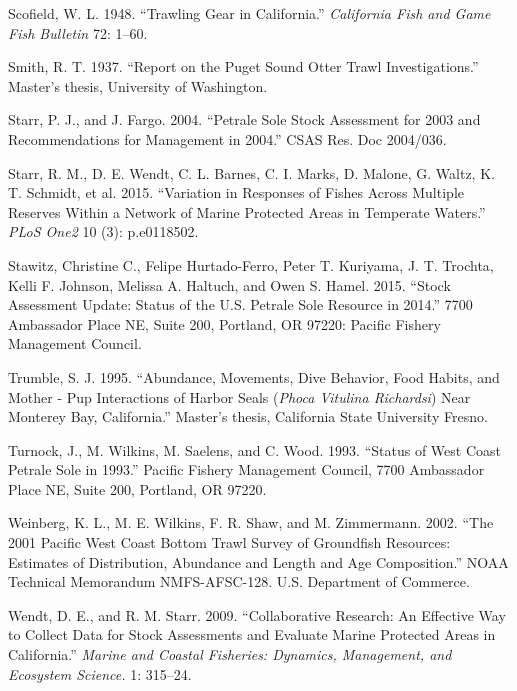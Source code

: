 \documentclass[11pt,
  english,
  letterpaper,
]{article}
\newlength{\cslhangindent}
\newenvironment{cslreferences}%
  {\setlength{\parindent}{0pt}%
  \everypar{\setlength{\hangindent}{\cslhangindent}}\ignorespaces}%
  {\par}
\begin{document}
\begin{cslreferences}
\leavevmode\hypertarget{ref-scofield_trawling_1948}{}%
Scofield, W. L. 1948. ``Trawling Gear in California.'' \emph{California Fish and Game Fish Bulletin} 72: 1--60.

\leavevmode\hypertarget{ref-smith_report_1937}{}%
Smith, R. T. 1937. ``Report on the Puget Sound Otter Trawl Investigations.'' Master's thesis, University of Washington.

\leavevmode\hypertarget{ref-starr_petrale_2004}{}%
Starr, P. J., and J. Fargo. 2004. ``Petrale Sole Stock Assessment for 2003 and Recommendations for Management in 2004.'' CSAS Res. Doc 2004/036.

\leavevmode\hypertarget{ref-Starr2015}{}%
Starr, R. M., D. E. Wendt, C. L. Barnes, C. I. Marks, D. Malone, G. Waltz, K. T. Schmidt, et al. 2015. ``Variation in Responses of Fishes Across Multiple Reserves Within a Network of Marine Protected Areas in Temperate Waters.'' \emph{PLoS One2} 10 (3): p.e0118502.

\leavevmode\hypertarget{ref-stawitz_stock_2015}{}%
Stawitz, Christine C., Felipe Hurtado-Ferro, Peter T. Kuriyama, J. T. Trochta, Kelli F. Johnson, Melissa A. Haltuch, and Owen S. Hamel. 2015. ``Stock Assessment Update: Status of the U.S. Petrale Sole Resource in 2014.'' 7700 Ambassador Place NE, Suite 200, Portland, OR 97220: Pacific Fishery Management Council.

\leavevmode\hypertarget{ref-trumble_abundance_1995}{}%
Trumble, S. J. 1995. ``Abundance, Movements, Dive Behavior, Food Habits, and Mother - Pup Interactions of Harbor Seals (\emph{Phoca Vitulina Richardsi}) Near Monterey Bay, California.'' Master's thesis, California State University Fresno.

\leavevmode\hypertarget{ref-turnock_status_1993}{}%
Turnock, J., M. Wilkins, M. Saelens, and C. Wood. 1993. ``Status of West Coast Petrale Sole in 1993.'' Pacific Fishery Management Council, 7700 Ambassador Place NE, Suite 200, Portland, OR 97220.

\leavevmode\hypertarget{ref-weinberg_2001_2002}{}%
Weinberg, K. L., M. E. Wilkins, F. R. Shaw, and M. Zimmermann. 2002. ``The 2001 Pacific West Coast Bottom Trawl Survey of Groundfish Resources: Estimates of Distribution, Abundance and Length and Age Composition.'' NOAA Technical Memorandum NMFS-AFSC-128. U.S. Department of Commerce.

\leavevmode\hypertarget{ref-Wendt2009}{}%
Wendt, D. E., and R. M. Starr. 2009. ``Collaborative Research: An Effective Way to Collect Data for Stock Assessments and Evaluate Marine Protected Areas in California.'' \emph{Marine and Coastal Fisheries: Dynamics, Management, and Ecosystem Science.} 1: 315--24.
\end{cslreferences}
\end{document}
